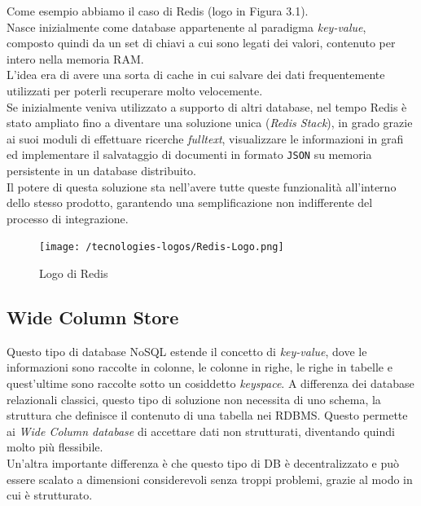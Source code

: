 \noindent Come esempio abbiamo il caso di Redis\cite{site:udemyredis} (logo in Figura 3.1).\\
Nasce inizialmente come database appartenente al paradigma \textit{key-value}, composto quindi da un set di chiavi a cui sono legati dei valori, contenuto per intero nella memoria RAM.\\
L'idea era di avere una sorta di cache in cui salvare dei dati frequentemente utilizzati per poterli recuperare molto velocemente.\\
Se inizialmente veniva utilizzato a supporto di altri database, nel tempo Redis è stato ampliato fino a diventare una soluzione unica (\textit{Redis Stack}), in grado grazie ai suoi moduli di effettuare ricerche \textit{fulltext}, visualizzare le informazioni in grafi ed implementare il salvataggio di documenti in formato \texttt{JSON} su memoria persistente in un \gls{database distribuito}.\\
Il potere di questa soluzione sta nell'avere tutte queste funzionalità all'interno dello stesso prodotto, garantendo una semplificazione non indifferente del processo di integrazione.

\begin{figure}[htbp]
\begin{center}
\texttt{[image: /tecnologies-logos/Redis-Logo.png]}
\caption{Logo di Redis}
\end{center}
\end{figure}

\subsection{Wide Column Store}
Questo tipo di database NoSQL estende il concetto di \textit{key-value}, dove le informazioni sono raccolte in colonne, le colonne in righe, le righe in tabelle e quest'ultime sono raccolte sotto un cosiddetto \textit{keyspace}. A differenza dei database relazionali classici, questo tipo di soluzione non necessita di uno schema, la struttura che definisce il contenuto di una tabella nei RDBMS. Questo permette ai \textit{Wide Column database} di accettare dati non strutturati, diventando quindi molto più flessibile.\\
Un'altra importante differenza è che questo tipo di DB è decentralizzato e può essere scalato a dimensioni considerevoli senza troppi problemi, grazie al modo in cui è strutturato.\\

